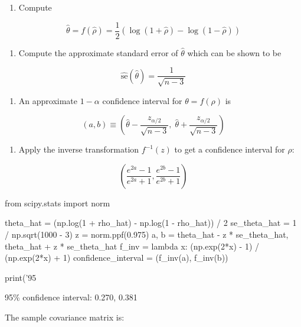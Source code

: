 \begin{enumerate}[tightlist,label={\arabic*.}]
\item
  Compute
\end{enumerate}

\[\hat{\theta} = f(\hat{\rho}) = \frac{1}{2} \left( \log(1 + \hat{\rho}) - \log(1 - \hat{\rho})\right) \]

\begin{enumerate}[tightlist,label={\arabic*.},resume]
\item
  Compute the approximate standard error of \(\hat{\theta}\) which can
  be shown to be
\end{enumerate}

\[\hat{\text{se}}(\hat{\theta}) = \frac{1}{\sqrt{n - 3}} \]

\begin{enumerate}[tightlist,label={\arabic*.},resume]
\item
  An approximate \(1 - \alpha\) confidence interval for
  \(\theta = f(\rho)\) is
\end{enumerate}

\[(a, b) \equiv \left(\hat{\theta} - \frac{z_{\alpha/2}}{\sqrt{n - 3}}, \; \hat{\theta} + \frac{z_{\alpha/2}}{\sqrt{n - 3}} \right)\]

\begin{enumerate}[tightlist,label={\arabic*.},resume]
\item
  Apply the inverse transformation \(f^{-1}(z)\) to get a confidence
  interval for \(\rho\):
\end{enumerate}

\[ \left( \frac{e^{2a} - 1}{e^{2a} + 1}, \frac{e^{2b} - 1}{e^{2b} + 1} \right) \]

\begin{python}
from scipy.stats import norm

theta_hat = (np.log(1 + rho_hat) - np.log(1 - rho_hat)) / 2
se_theta_hat = 1 / np.sqrt(1000 - 3)
z = norm.ppf(0.975)
a, b = theta_hat - z * se_theta_hat, theta_hat + z * se_theta_hat
f_{i}nv = lambda x: (np.exp(2*x) - 1) / (np.exp(2*x) + 1)
confidence_{i}nterval = (f_{i}nv(a), f_{i}nv(b))

print('95%
\end{python}

\begin{console}
95\% confidence interval: 0.270, 0.381
\end{console}

The sample covariance matrix is:

